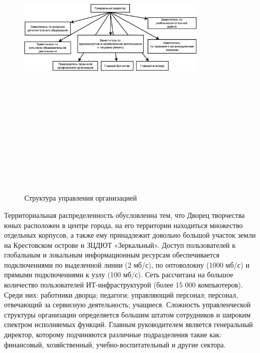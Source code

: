 \documentclass[utf8,usehyperref,12pt]{G7-32}
\begin{document}
\begin{figure}[ht]
   \centering%
   \includegraphics[height=160mm, width=0.8\textwidth, clip, keepaspectratio]{pictures/management_structure.eps}
   \caption{Структура управления организацией}\label{fig:fig_management_struct}
 \end{figure}

Территориальная распределенность обусловленна тем, что Дворец творчества юных расположен в центре города, на его территории находиться множество отдельных корпусов, а также ему принадлежит довольно большой участок земли на Крестовском острове и ЗЦДЮТ «Зеркальный». Доступ пользователей к глобальным и локальным информационным ресурсам обеспечивается подключениями по выделенной линии
(2 мб/с), по оптоволокну (1000 мб/с) и прямыми подключениями к узлу (100 мб/с). Сеть рассчитана на большое количество пользователей ИТ-инфраструктурой (более
15 000 компьютеров). Среди них: работники дворца; педагоги; управляющий персонал;  персонал, отвечающий за сервисную деятельность; учащиеся. Сложность управленческой структуры организации определяется большим штатом сотрудников и широким спектром исполняемых функций. Главным руководителем является генеральный директор, которому подчиняются различные подразделения такие как: финансовый, хозяйственный, учебно-воспитательный и другие сектора.
\end{document}

